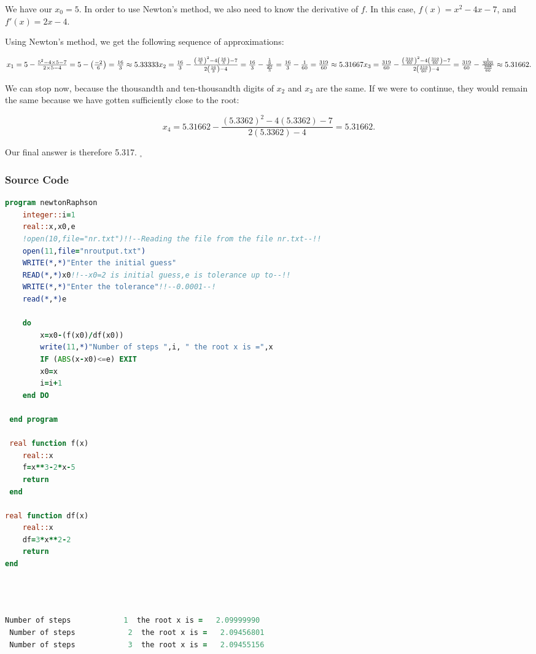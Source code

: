 \documentclass{article}
\begin{document}
We have our \(x_0 = 5\). In order to use Newton's method, we also need to know the derivative of \(f\). In this case, \(f(x) = x^2 - 4x - 7\), and \(f'(x) = 2x - 4\).

Using Newton's method, we get the following sequence of approximations:

$ x_1 = 5 - \frac{5^2 - 4\times 5 - 7}{2\times 5 - 4} = 5 - \left(\frac{-2}{6}\right) = \frac{16}{3} \approx 5.33333\\ x_2 = \frac{16}{3} - \frac{\left(\frac{16}{3}\right)^2 - 4\left(\frac{16}{3}\right) - 7}{2\left(\frac{16}{3}\right)-4} = \frac{16}{3} - \frac{\frac{1}{9}}{\frac{20}{3}} = \frac{16}{3} - \frac{1}{60} = \frac{319}{60} \approx 5.31667 \\ x_3 = \frac{319}{60} - \frac{\left(\frac{319}{60}\right)^2 - 4\left(\frac{319}{60}\right) - 7}{2\left(\frac{319}{60}\right)-4} = \frac{319}{60} - \frac{\frac{1}{3600}}{\frac{398}{60}} \approx 5.31662.$  

We can stop now, because the thousandth and ten-thousandth digits of \(x_2\) and \(x_3\) are the same. If we were to continue, they would remain the same because we have gotten sufficiently close to the root:

\[x_4 = 5.31662 - \frac{(5.3362)^2-4(5.3362)-7}{2(5.3362)-4} = 5.31662.\]

Our final answer is therefore 5.317. \( _\square \)\cite{newtonraphson}
\subsubsection{Source Code}
\begin{lstlisting}[language=Fortran,caption=Newton Raphson Method]
program newtonRaphson
    integer::i=1
    real::x,x0,e
    !open(10,file="nr.txt")!!--Reading the file from the file nr.txt--!!
    open(11,file="nroutput.txt")
    WRITE(*,*)"Enter the initial guess"
    READ(*,*)x0!!--x0=2 is initial guess,e is tolerance up to--!!
    WRITE(*,*)"Enter the tolerance"!!--0.0001--!
    read(*,*)e

    do
        x=x0-(f(x0)/df(x0))
        write(11,*)"Number of steps ",i, " the root x is =",x
        IF (ABS(x-x0)<=e) EXIT
        x0=x
        i=i+1
    end DO

 end program

 real function f(x)
    real::x
    f=x**3-2*x-5
    return
 end

real function df(x)
    real::x
    df=3*x**2-2
    return
end





\end{lstlisting}
\begin{lstlisting}[language=Fortran,caption=Newton Rhapson Method Output]
 Number of steps            1  the root x is =   2.09999990    
 Number of steps            2  the root x is =   2.09456801    
 Number of steps            3  the root x is =   2.09455156    
\end{lstlisting}
\end{document}
